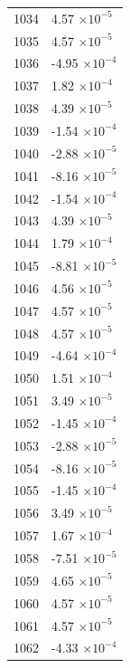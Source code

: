 \documentclass[a4paper,11pt]{article}
\begin{document}
\begin{center}
\begin{longtable}{|R{1.5cm}|R{2.5cm}|}
 1034 &         4.57 $\times 10^{          -5}$ \\
 1035 &         4.57 $\times 10^{          -5}$ \\
 1036 &        -4.95 $\times 10^{          -4}$ \\
 1037 &         1.82 $\times 10^{          -4}$ \\
 1038 &         4.39 $\times 10^{          -5}$ \\
 1039 &        -1.54 $\times 10^{          -4}$ \\
 1040 &        -2.88 $\times 10^{          -5}$ \\
 1041 &        -8.16 $\times 10^{          -5}$ \\
 1042 &        -1.54 $\times 10^{          -4}$ \\
 1043 &         4.39 $\times 10^{          -5}$ \\
 1044 &         1.79 $\times 10^{          -4}$ \\
 1045 &        -8.81 $\times 10^{          -5}$ \\
 1046 &         4.56 $\times 10^{          -5}$ \\
 1047 &         4.57 $\times 10^{          -5}$ \\
 1048 &         4.57 $\times 10^{          -5}$ \\
 1049 &        -4.64 $\times 10^{          -4}$ \\
 1050 &         1.51 $\times 10^{          -4}$ \\
 1051 &         3.49 $\times 10^{          -5}$ \\
 1052 &        -1.45 $\times 10^{          -4}$ \\
 1053 &        -2.88 $\times 10^{          -5}$ \\
 1054 &        -8.16 $\times 10^{          -5}$ \\
 1055 &        -1.45 $\times 10^{          -4}$ \\
 1056 &         3.49 $\times 10^{          -5}$ \\
 1057 &         1.67 $\times 10^{          -4}$ \\
 1058 &        -7.51 $\times 10^{          -5}$ \\
 1059 &         4.65 $\times 10^{          -5}$ \\
 1060 &         4.57 $\times 10^{          -5}$ \\
 1061 &         4.57 $\times 10^{          -5}$ \\
 1062 &        -4.33 $\times 10^{          -4}$ \\

\end{longtable}
\end{center}
\end{document}

